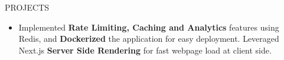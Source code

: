 \documentclass{resume} %
\begin{document}
\begin{rSection}{PROJECTS}
\begin{itemize}
        \item Implemented \textbf{Rate Limiting, Caching and Analytics} features using Redis, and \textbf{Dockerized} the application for easy deployment. Leveraged Next.js \textbf{Server Side Rendering} for fast webpage load at client side.
    \end{itemize}


\end{rSection}
\end{document}
